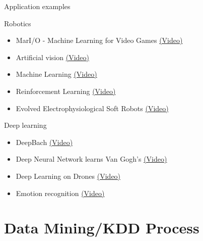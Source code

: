 \documentclass{beamer}
\begin{document}
\begin{frame}{Application examples}

Robotics
\begin{itemize}
    \item MarI/O - Machine Learning for Video Games \href{https://www.youtube.com/watch?v=qv6UVOQ0F44}{(Video)}
    \item Artificial vision \href{https://www.youtube.com/watch?v=4KlYdCBdjEg}{(Video)}
    \item Machine Learning \href{https://www.youtube.com/watch?v=pgaEE27nsQw}{(Video)}
    \item Reinforcement Learning \href{https://www.youtube.com/watch?v=W\_gxLKSsSIE}{(Video)}
    \item Evolved Electrophysiological Soft Robots \href{https://www.youtube.com/watch?v=HgWQ-gPIvt4}{(Video)}
\end{itemize}

Deep learning
\begin{itemize}
    \item DeepBach \href{https://www.youtube.com/watch?v=QiBM7-5hA6o}{(Video)}
    \item Deep Neural Network learns Van Gogh's \href{https://www.youtube.com/watch?v=-R9bJGNHltQ}{(Video)}
    \item Deep Learning on Drones \href{https://www.youtube.com/watch?v=wSFYOw4VIYY}{(Video)}
    \item Emotion recognition \href{https://www.youtube.com/watch?v=PL3xJErjEgU}{(Video)}
\end{itemize}


\end{frame}



\section{Data Mining/KDD Process}
\end{document}
